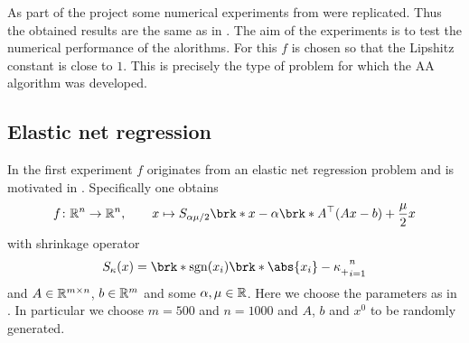 %
%
%
%
%		
%
%
%
%
%		
%



As part of the project some numerical experiments from \cite{ZhaAA} were replicated. Thus the obtained results are the same as in \cite{ZhaAA}. The aim of the experiments is to test the numerical performance of the alorithms. For this $f$ is chosen so that the Lipshitz constant is close to $1$. This is precisely the type of problem for which the AA algorithm was developed.

\subsection{Elastic net regression}

In the first experiment $f$ originates from an elastic net regression problem and is motivated in \cite[Section 5.1f]{ZhaAA}. Specifically one obtains
\begin{align*}
	f\colon\R^{n}\to\R^{n}, \qquad x\mapsto S_{\alpha\mu/2}\brk*{x-\alpha\brk*{A^\top(Ax-b)+\frac{\mu}{2}x}}
\end{align*}
with shrinkage operator
\begin{align*}
	S_\kappa(x) = \brk*{\sgn(x_i)\brk*{\abs{x_i}-\kappa}_+}_{i=1}^{n}
\end{align*}
and $A\in\mathbb{R}^{m\times n}$, $b\in\mathbb{R}^{m}$ and some $\alpha, \mu\in\mathbb{R}$. Here we choose the parameters as in \cite[Section 5.2]{ZhaAA}. In particular we choose $m=500$ and $n=1000$ and $A$, $b$ and $x^0$ to be randomly generated.

